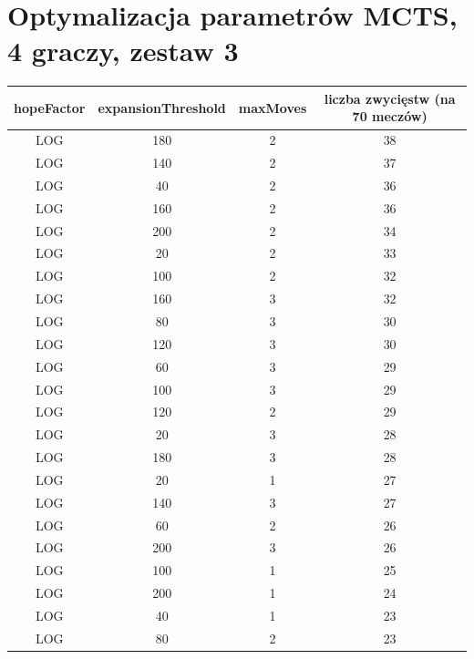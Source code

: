 \documentclass{pracamgr}
\begin{document}
\begin{appendices}
\begin{center}
\begin{tabular}{| c | c | c | c |}
    \end{tabular}
\end{center}

\vfill
\hspace{0pt}
\pagebreak

\section{Optymalizacja parametrów MCTS, 4 graczy, zestaw 3\label{results-3-4p}}

\begin{center}
    \vspace{0pt}
    \begin{tabular}{| c | c | c | c |}
	\hline
    hopeFactor & expansionThreshold & maxMoves & liczba zwycięstw (na 70 meczów) \\ \hline
        LOG & 180 & 2 & 38 \\ \hline
        LOG & 140 & 2 & 37 \\ \hline
        LOG & 40 & 2 & 36 \\ \hline
        LOG & 160 & 2 & 36 \\ \hline
        LOG & 200 & 2 & 34 \\ \hline
        LOG & 20 & 2 & 33 \\ \hline
        LOG & 100 & 2 & 32 \\ \hline
        LOG & 160 & 3 & 32 \\ \hline
        LOG & 80 & 3 & 30 \\ \hline
        LOG & 120 & 3 & 30 \\ \hline
        LOG & 60 & 3 & 29 \\ \hline
        LOG & 100 & 3 & 29 \\ \hline
        LOG & 120 & 2 & 29 \\ \hline
        LOG & 20 & 3 & 28 \\ \hline
        LOG & 180 & 3 & 28 \\ \hline
        LOG & 20 & 1 & 27 \\ \hline
        LOG & 140 & 3 & 27 \\ \hline
        LOG & 60 & 2 & 26 \\ \hline
        LOG & 200 & 3 & 26 \\ \hline
        LOG & 100 & 1 & 25 \\ \hline
        LOG & 200 & 1 & 24 \\ \hline
        LOG & 40 & 1 & 23 \\ \hline
        LOG & 80 & 2 & 23 \\ \hline

\end{tabular}
\end{center}
\end{appendices}
\end{document}
